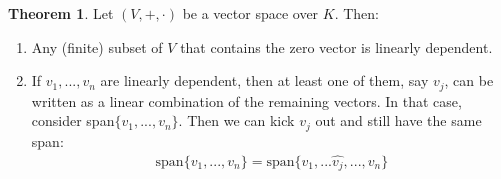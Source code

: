 \documentclass[11pt]{scrartcl}
\theoremstyle{definition}
\newtheorem{theorem}{Theorem}
\theoremstyle{remark}
\newcommand{\vsok}[0]{Let $(V, +, \cdot)$ be a vector space over $K$}
\begin{document}
\begin{theorem}
	\vsok. Then: 
	\begin{enumerate}[noitemsep]
		\item Any (finite) subset of $V$ that contains the zero vector is linearly dependent. 
		\item If $v_1, ..., v_n$ are linearly dependent, then at least one of them, say $v_j$, can be written as a linear combination of the remaining vectors. In that case, consider span$\{ v_1, ..., v_n\}$. Then we can kick $v_j$ out and still have the same span: 
		\begin{align*}
			\text{span} \{ v_1, ..., v_n \} = \text{span} \{ v_1, ... \hat{v_j}, ..., v_n \} 
		\end{align*}
	\end{enumerate}
\end{theorem}
\end{document}
